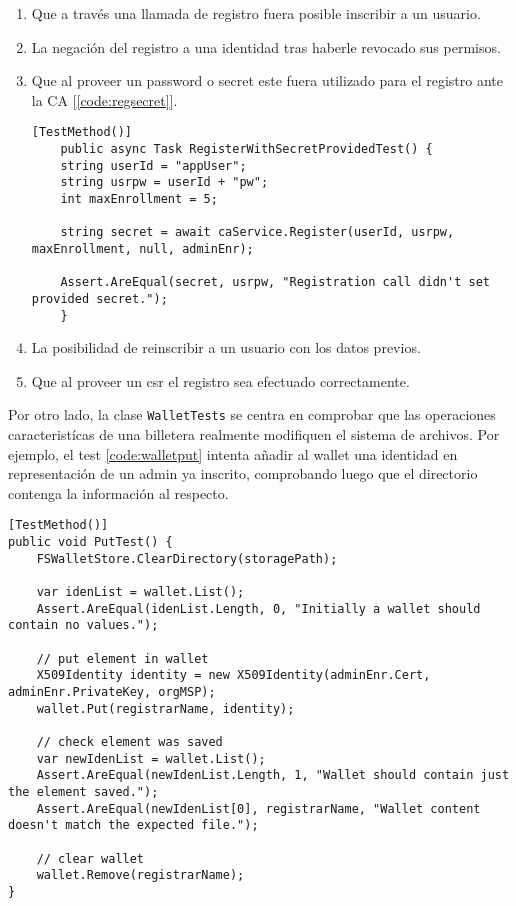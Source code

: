 \begin{enumerate}
	\item Que a trav\'es una llamada de registro fuera posible inscribir a un usuario.
	
	\item La negaci\'on del registro a una identidad tras haberle revocado sus permisos.
	
	\item Que al proveer un password o secret este fuera utilizado para el registro ante la CA [\ref{code:regsecret}].
	
	\begin{lstlisting}[caption={Test de la clase \texttt{CAServiceTests} para comprobar que el secret provisto se utilice en el registro.}, label={code:regsecret}]
	[TestMethod()]
	public async Task RegisterWithSecretProvidedTest() {
	string userId = "appUser";
	string usrpw = userId + "pw";
	int maxEnrollment = 5;
	
	string secret = await caService.Register(userId, usrpw, maxEnrollment, null, adminEnr);
	
	Assert.AreEqual(secret, usrpw, "Registration call didn't set provided secret.");
	}
	\end{lstlisting}
	
	\item La posibilidad de reinscribir a un usuario con los datos previos.
	
	\item Que al proveer un csr el registro sea efectuado correctamente.
\end{enumerate}

Por otro lado, la clase \texttt{WalletTests} se centra en comprobar que las operaciones caracterist\'icas de una billetera realmente modifiquen el sistema de archivos. Por ejemplo, el test \ref{code:walletput} intenta a\~nadir al wallet una identidad en representaci\'on de un admin ya inscrito, comprobando luego que el directorio contenga la informaci\'on al respecto.

\begin{lstlisting}[caption={Test para chequear el m\'etodo \texttt{Put} de la clase \texttt{Wallet}.}, label={code:walletput}]
[TestMethod()]
public void PutTest() {
	FSWalletStore.ClearDirectory(storagePath);

	var idenList = wallet.List();
	Assert.AreEqual(idenList.Length, 0, "Initially a wallet should contain no values.");

	// put element in wallet
	X509Identity identity = new X509Identity(adminEnr.Cert, adminEnr.PrivateKey, orgMSP);
	wallet.Put(registrarName, identity);

	// check element was saved
	var newIdenList = wallet.List();
	Assert.AreEqual(newIdenList.Length, 1, "Wallet should contain just the element saved.");
	Assert.AreEqual(newIdenList[0], registrarName, "Wallet content doesn't match the expected file.");

	// clear wallet
	wallet.Remove(registrarName);
}
\end{lstlisting}

